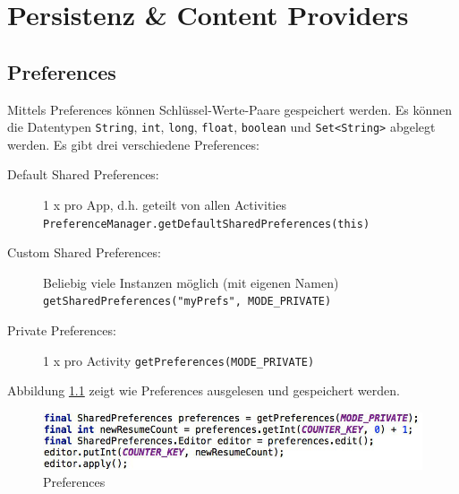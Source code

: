 \chapter{Persistenz \& Content Providers}

\section{Preferences}

Mittels Preferences können Schlüssel-Werte-Paare gespeichert werden. Es können die Datentypen \texttt{String}, \texttt{int}, \texttt{long}, \texttt{float}, \texttt{boolean} und \texttt{Set<String>} abgelegt werden. Es gibt drei verschiedene Preferences:
\begin{description}
	\item[Default Shared Preferences:] 1 x pro App, d.h. geteilt von allen Activities \\ \texttt{PreferenceManager.getDefaultSharedPreferences(this)}
	\item[Custom Shared Preferences:] Beliebig viele Instanzen möglich (mit eigenen Namen) \\ \texttt{getSharedPreferences("myPrefs", MODE\_PRIVATE)}
	\item[Private Preferences:] 1 x pro Activity \texttt{getPreferences(MODE\_PRIVATE)}
\end{description}
Abbildung \ref{fig:preferences} zeigt wie Preferences ausgelesen und gespeichert werden.
\begin{figure}
\centering
\includegraphics[width=\linewidth]{fig/preferences}
\caption{Preferences}
\label{fig:preferences}
\end{figure}

